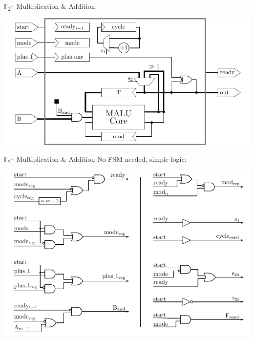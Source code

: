 \documentclass[svgnames]{beamer}
\newenvironment{changemargin}[2]{%
\begin{list}{}{%
\setlength{\topsep}{0pt}%
\setlength{\leftmargin}{#1}%
\setlength{\rightmargin}{#2}%
\setlength{\listparindent}{\parindent}%
\setlength{\itemindent}{\parindent}%
\setlength{\parsep}{\parskip}%
}%
\item[]}{\end{list}}
\begin{document}
\begin{frame}{$\mathbb{F}_{2^m}$ Multiplication \& Addition}
	\begin{changemargin}{-4cm}{-4cm}
		\begin{center}\includegraphics[height=0.65\paperheight]{images/wrapper-gf2m}\end{center}
	\end{changemargin}
\end{frame}

\begin{frame}{$\mathbb{F}_{2^m}$ Multiplication \& Addition}
	No FSM needed, simple logic:\\[0.7em]
	\begin{changemargin}{-4cm}{-4cm}
		\begin{center}\includegraphics[height=0.55\paperheight]{images/wrapper-gf2m-logica}\end{center}
	\end{changemargin}
\end{frame}
\end{document}
